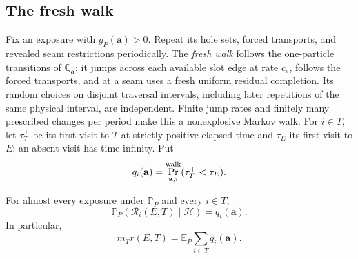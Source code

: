 \subsection{The fresh walk}

Fix an exposure with $g_P(\mathbf a)>0$.  Repeat its hole sets,
forced transports, and revealed seam restrictions periodically.
The \emph{fresh walk} follows the one-particle transitions of
$\mathbb Q_{\mathbf a}$: it jumps across each available slot edge
at rate $c_e$, follows the forced transports, and at a seam uses a
fresh uniform residual completion.  Its random choices on disjoint
traversal intervals, including later repetitions of the same physical
interval, are independent.  Finite jump rates and finitely many
prescribed changes per period make this a nonexplosive Markov walk.
For $i\in T$, let $\tau_T^+$ be its first visit to $T$ at strictly
positive elapsed time and $\tau_E$ its first visit to $E$; an absent
visit has time infinity.  Put
\begin{equation}\label{eq:fresh-q}
             q_i(\mathbf a)=\Pr^{\rm walk}_{\mathbf a,i}
                                         (\tau_T^+<\tau_E).
\end{equation}

\begin{proposition}\label{prop:fresh-walk}
For almost every exposure under $\mathbb P_P$ and every $i\in T$,
\[
       \mathbb P_P(\mathcal R_i(E,T)\mid\mathscr H)=q_i(\mathbf a).
\]
In particular,
\begin{equation}\label{eq:fresh-return}
                m_Tr(E,T)=\mathbb E_P\sum_{i\in T}q_i(\mathbf a).
\end{equation}
\end{proposition}

